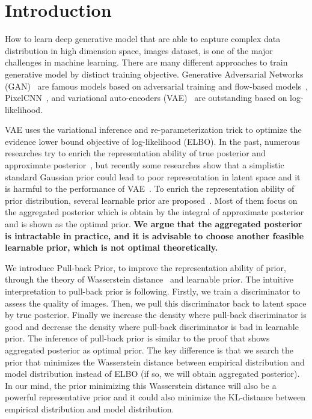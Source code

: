 \section{Introduction}

How to learn deep generative model that are able to capture complex data distribution in high dimension space, \IE images dataset, is one of the major challenges in machine learning. There are many different approaches to train generative model by distinct training objective. Generative Adversarial Networks (GAN)~\cite{goodfellow2014generative} are famous models based on adversarial training and flow-based models~\cite{dinh2016density,kingma2018glow}, PixelCNN~\cite{van2016conditional}, and variational auto-encoders (VAE)~\cite{kingma2014auto,rezende_stochastic_2014} are outstanding based on log-likelihood. 

VAE uses the variational inference and re-parameterization trick to optimize the evidence lower bound objective of log-likelihood (ELBO). In the past, numerous researches try to enrich the representation ability of true posterior and approximate posterior~\cite{kingma2016improved,tomczak2016improving}, but recently some researches show that a simplistic standard Gaussian prior could lead to poor representation in latent space and it is harmful to the performance of VAE~\cite{tomczak2018vae}. To enrich the representation ability of prior distribution, several learnable prior are proposed~\cite{tomczak2018vae,bauer2019resampled,takahashi2019variational}. Most of them focus on the aggregated posterior which is obtain by the integral of approximate posterior and is shown as the optimal prior. \textbf{We argue that the aggregated posterior is intractable in practice, and it is advisable to choose another feasible learnable prior, which is not optimal theoretically. } 

We introduce Pull-back Prior, to improve the representation ability of prior, through the theory of Wasserstein distance~\cite{arjovsky2017wasserstein} and learnable prior. 
The intuitive interpretation to pull-back prior is following. Firstly, we train a discriminator to assess the quality of images. Then, we pull this discriminator back to latent space by true posterior. Finally we increase the density where pull-back discriminator is good and decrease the density where pull-back discriminator is bad in learnable prior. 
The inference of pull-back prior is similar to the proof that shows aggregated posterior as optimal prior. 
The key difference is that we search the prior that minimizes the Wasserstein distance between empirical distribution and model distribution instead of ELBO (if so, we will obtain aggregated posterior). In our mind, the prior minimizing this Wasserstein distance will also be a powerful representative prior and it could also minimize the KL-distance between empirical distribution and model distribution. 

